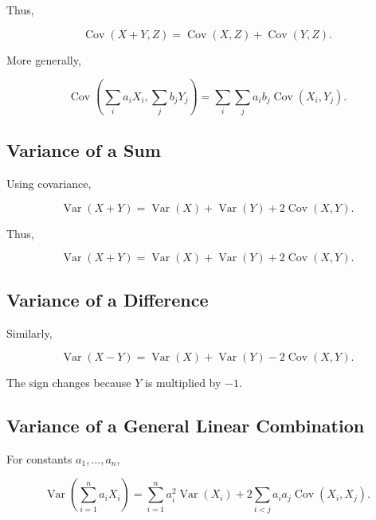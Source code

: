 Thus,

\[
\boxed{
\operatorname{Cov}(X+Y,Z)
=
\operatorname{Cov}(X,Z)
+
\operatorname{Cov}(Y,Z).
}
\]

More generally,

\[
\boxed{
\operatorname{Cov}
\left(
\sum_i a_iX_i,
\sum_j b_jY_j
\right)
=
\sum_i\sum_j
a_ib_j
\operatorname{Cov}(X_i,Y_j).
}
\]

\subsection{Variance of a Sum}
\label{subsec:variance-sum}

Using covariance,

\[
\operatorname{Var}(X+Y)
=
\operatorname{Var}(X)
+
\operatorname{Var}(Y)
+
2\operatorname{Cov}(X,Y).
\]

Thus,

\[
\boxed{
\operatorname{Var}(X+Y)
=
\operatorname{Var}(X)
+
\operatorname{Var}(Y)
+
2\operatorname{Cov}(X,Y).
}
\]

\subsection{Variance of a Difference}
\label{subsec:variance-difference}

Similarly,

\[
\boxed{
\operatorname{Var}(X-Y)
=
\operatorname{Var}(X)
+
\operatorname{Var}(Y)
-
2\operatorname{Cov}(X,Y).
}
\]

The sign changes because \(Y\) is multiplied by \(-1\).

\subsection{Variance of a General Linear Combination}
\label{subsec:variance-linear-combination}

For constants \(a_1,\ldots,a_n\),

\[
\boxed{
\operatorname{Var}
\left(
\sum_{i=1}^{n}a_iX_i
\right)
=
\sum_{i=1}^{n}
a_i^2
\operatorname{Var}(X_i)
+
2
\sum_{i<j}
a_ia_j
\operatorname{Cov}(X_i,X_j).
}
\]

